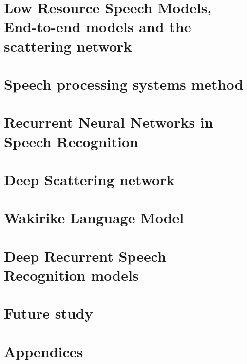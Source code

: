 \documentclass[12pt,twoside]{report}
\begin{document}
\chapter{Low Resource Speech Models, End-to-end models and the scattering network}\label{c02}


\chapter{Speech processing systems method}\label{ch3Method}


\chapter{Recurrent Neural Networks in Speech Recognition}\label{ch3RNN}


\chapter{Deep Scattering network}\label{ch4DSN}


\chapter{Wakirike Language Model}\label{ch6_wlm}


\chapter{Deep Recurrent Speech Recognition models}\label{ch6_speech}


\chapter{Future study}\label{ch8_future}

\chapter*{Appendices}
\label{ch08furtherstudy}
\chapter*{\appendix}




\end{document}

